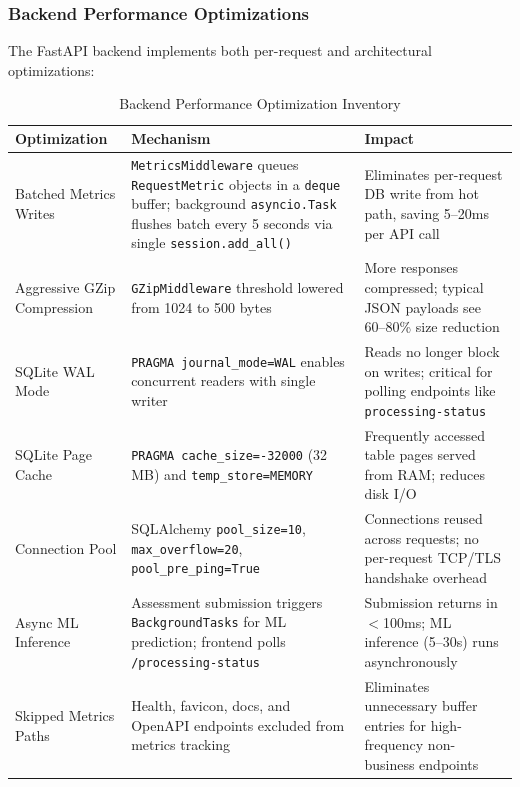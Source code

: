\documentclass[12pt]{article}
\begin{document}
	\subsubsection{Backend Performance Optimizations}

	The FastAPI backend implements both per-request and architectural optimizations:

	\begin{table}[H]
		\centering
		\caption{Backend Performance Optimization Inventory}
		\small
		\begin{tabular}{|p{3.5cm}|p{4cm}|p{4.5cm}|}
			\hline
			\textbf{Optimization} & \textbf{Mechanism} & \textbf{Impact} \\ \hline
			Batched Metrics Writes & \texttt{MetricsMiddleware} queues \texttt{RequestMetric} objects in a \texttt{deque} buffer; background \texttt{asyncio.Task} flushes batch every 5 seconds via single \texttt{session.add\_all()} & Eliminates per-request DB write from hot path, saving 5--20ms per API call \\ \hline
			Aggressive GZip Compression & \texttt{GZipMiddleware} threshold lowered from 1024 to 500 bytes & More responses compressed; typical JSON payloads see 60--80\% size reduction \\ \hline
			SQLite WAL Mode & \texttt{PRAGMA journal\_mode=WAL} enables concurrent readers with single writer & Reads no longer block on writes; critical for polling endpoints like \texttt{processing-status} \\ \hline
			SQLite Page Cache & \texttt{PRAGMA cache\_size=-32000} (32 MB) and \texttt{temp\_store=MEMORY} & Frequently accessed table pages served from RAM; reduces disk I/O \\ \hline
			Connection Pool & SQLAlchemy \texttt{pool\_size=10}, \texttt{max\_overflow=20}, \texttt{pool\_pre\_ping=True} & Connections reused across requests; no per-request TCP/TLS handshake overhead \\ \hline
			Async ML Inference & Assessment submission triggers \texttt{BackgroundTasks} for ML prediction; frontend polls \texttt{/processing-status} & Submission returns in $<$100ms; ML inference (5--30s) runs asynchronously \\ \hline
			Skipped Metrics Paths & Health, favicon, docs, and OpenAPI endpoints excluded from metrics tracking & Eliminates unnecessary buffer entries for high-frequency non-business endpoints \\ \hline
		\end{tabular}
	\end{table}
\end{document}
